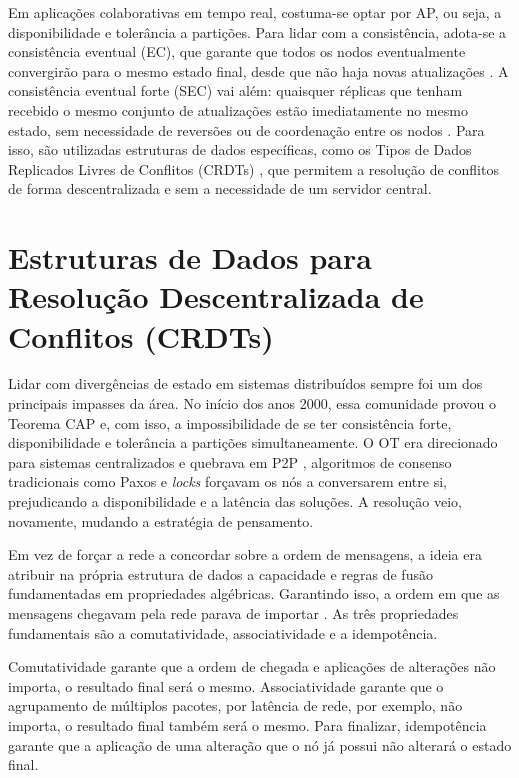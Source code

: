 Em aplicações colaborativas em tempo real, costuma-se optar por AP, ou seja, a disponibilidade e tolerância a partições. Para lidar
com a consistência, adota-se a consistência eventual (EC), que garante que todos os nodos eventualmente convergirão para o mesmo
estado final, desde que não haja novas atualizações \cite{vogels2009}. A consistência eventual forte (SEC) vai além: quaisquer
réplicas que tenham recebido o mesmo conjunto de atualizações estão imediatamente no mesmo estado, sem necessidade de reversões
ou de coordenação entre os nodos \cite{shapiro2011}. Para isso, são utilizadas estruturas de
dados específicas, como os Tipos de Dados Replicados Livres de Conflitos (CRDTs) \cite{shapiro2011}, que permitem a resolução de
conflitos de forma descentralizada e sem a necessidade de um servidor central.

\section{Estruturas de Dados para Resolução Descentralizada de Conflitos (CRDTs)}

Lidar com divergências de estado em sistemas distribuídos sempre foi um dos principais impasses da área. No início dos anos 2000,
essa comunidade provou o Teorema CAP \cite{brewer2000,gilbertlynch2002} e, com isso, a impossibilidade de se ter consistência
forte, disponibilidade e tolerância a partições simultaneamente. O OT era direcionado para sistemas centralizados e quebrava em P2P \cite{oster2006},
algoritmos de consenso tradicionais como Paxos \cite{lamport1998} e \textit{locks} forçavam os nós a conversarem entre si, prejudicando a disponibilidade
e a latência das soluções. A resolução veio, novamente, mudando a estratégia de pensamento.

Em vez de forçar a rede a concordar sobre a ordem de mensagens, a ideia era atribuir na própria estrutura de dados a capacidade e regras de fusão
fundamentadas em propriedades algébricas. Garantindo isso, a ordem em que as mensagens chegavam pela rede parava de importar \cite{shapiro2011}. As três
propriedades fundamentais são a comutatividade, associatividade e a idempotência.

Comutatividade garante que a ordem de chegada e aplicações de alterações não importa, o resultado final será o mesmo. Associatividade garante
que o agrupamento de múltiplos pacotes, por latência de rede, por exemplo, não importa, o resultado final também será o mesmo. Para finalizar, idempotência
garante que a aplicação de uma alteração que o nó já possui não alterará o estado final.

